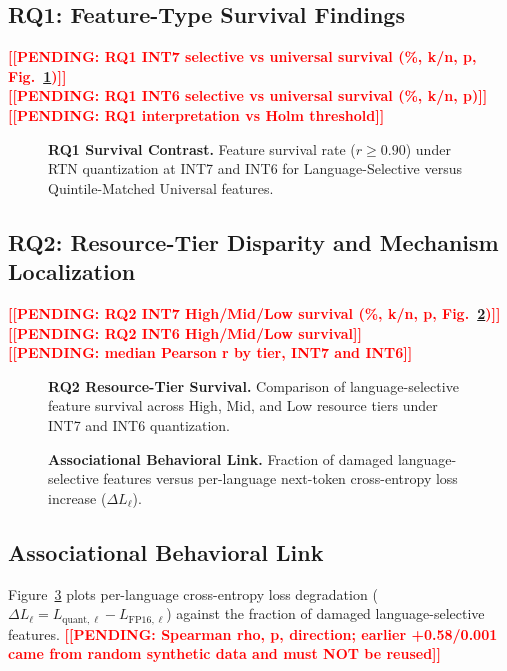 \documentclass[11pt]{article}
\newcommand{\TODO}[1]{\textbf{\textcolor{red}{[[#1]]}}}
\begin{document}
\subsection{RQ1: Feature-Type Survival Findings}
\TODO{PENDING: RQ1 INT7 selective vs universal survival (\%, k/n, p, Fig.~\ref{fig:rq1})}\\
\TODO{PENDING: RQ1 INT6 selective vs universal survival (\%, k/n, p)}\\
\TODO{PENDING: RQ1 interpretation vs Holm threshold}

\begin{figure}[t]
\centering
\fbox{\parbox[c][5cm][c]{0.9\linewidth}{\centering\TODO{fig:rq1}}}
\caption{\textbf{RQ1 Survival Contrast.} Feature survival rate ($r \ge 0.90$) under RTN quantization at INT7 and INT6 for Language-Selective versus Quintile-Matched Universal features.}
\label{fig:rq1}
\end{figure}

\subsection{RQ2: Resource-Tier Disparity and Mechanism Localization}
\TODO{PENDING: RQ2 INT7 High/Mid/Low survival (\%, k/n, p, Fig.~\ref{fig:rq2})}\\
\TODO{PENDING: RQ2 INT6 High/Mid/Low survival}\\
\TODO{PENDING: median Pearson r by tier, INT7 and INT6}

\begin{figure}[t]
\centering
\fbox{\parbox[c][5cm][c]{0.9\linewidth}{\centering\TODO{fig:rq2}}}
\caption{\textbf{RQ2 Resource-Tier Survival.} Comparison of language-selective feature survival across High, Mid, and Low resource tiers under INT7 and INT6 quantization.}
\label{fig:rq2}
\end{figure}

\begin{figure}[t]
\centering
\fbox{\parbox[c][5cm][c]{0.9\linewidth}{\centering\TODO{fig:behavioral}}}
\caption{\textbf{Associational Behavioral Link.} Fraction of damaged language-selective features versus per-language next-token cross-entropy loss increase ($\Delta L_\ell$).}
\label{fig:behavioral}
\end{figure}

\subsection{Associational Behavioral Link}
Figure~\ref{fig:behavioral} plots per-language cross-entropy loss degradation ($\Delta L_\ell = L_{\text{quant},\ell} - L_{\text{FP16},\ell}$) against the fraction of damaged language-selective features. \TODO{PENDING: Spearman rho, p, direction; earlier +0.58/0.001 came from random synthetic data and must NOT be reused}
\end{document}
